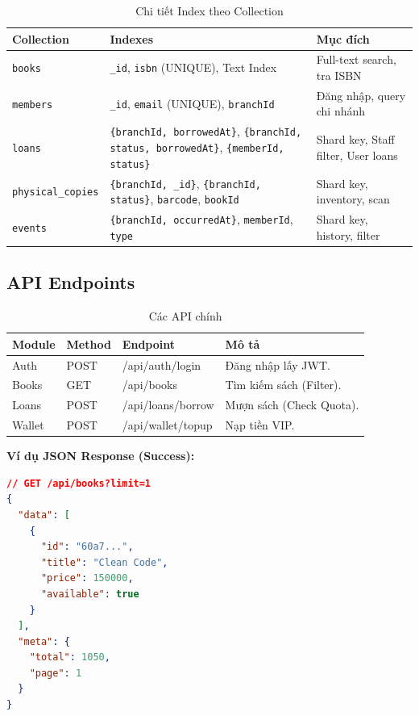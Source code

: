 \documentclass[a4paper,12pt]{article}
\begin{document}
\begin{table}[H]
\centering
\begin{tabularx}{\textwidth}{|l|X|X|}
\hline
\textbf{Collection} & \textbf{Indexes} & \textbf{Mục đích} \\
\hline
\texttt{books} & \texttt{\_id}, \texttt{isbn} (UNIQUE), Text Index & Full-text search, tra ISBN \\
\hline
\texttt{members} & \texttt{\_id}, \texttt{email} (UNIQUE), \texttt{branchId} & Đăng nhập, query chi nhánh \\
\hline
\texttt{loans} & \texttt{\{branchId, borrowedAt\}}, \texttt{\{branchId, status, borrowedAt\}}, \texttt{\{memberId, status\}} & Shard key, Staff filter, User loans \\
\hline
\texttt{physical\_copies} & \texttt{\{branchId, \_id\}}, \texttt{\{branchId, status\}}, \texttt{barcode}, \texttt{bookId} & Shard key, inventory, scan \\
\hline
\texttt{events} & \texttt{\{branchId, occurredAt\}}, \texttt{memberId}, \texttt{type} & Shard key, history, filter \\
\hline
\end{tabularx}
\caption{Chi tiết Index theo Collection}
\end{table}

\subsection{API Endpoints}
\begin{table}[H]
\centering
\begin{tabularx}{\textwidth}{|l|l|l|X|}
\hline
\textbf{Module} & \textbf{Method} & \textbf{Endpoint} & \textbf{Mô tả} \\
\hline
Auth & POST & /api/auth/login & Đăng nhập lấy JWT. \\
\hline
Books & GET & /api/books & Tìm kiếm sách (Filter). \\
\hline
Loans & POST & /api/loans/borrow & Mượn sách (Check Quota). \\
\hline
Wallet & POST & /api/wallet/topup & Nạp tiền VIP. \\
\hline
\end{tabularx}
\caption{Các API chính}
\end{table}

\textbf{Ví dụ JSON Response (Success):}
\begin{lstlisting}[language=json]
// GET /api/books?limit=1
{
  "data": [
    {
      "id": "60a7...",
      "title": "Clean Code",
      "price": 150000,
      "available": true
    }
  ],
  "meta": {
    "total": 1050,
    "page": 1
  }
}
\end{lstlisting}
\end{document}
